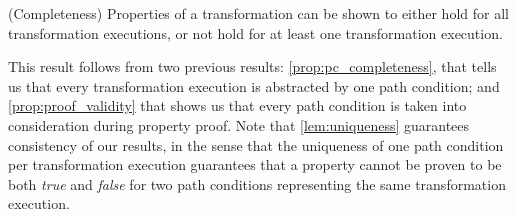 \begin{proposition}{(Completeness) Properties of a transformation can be shown to either hold for all transformation executions, or not hold for at least one transformation execution.}
\label{prop:proof_completeness}
\end{proposition}
\begin{pf}
This result follows from two previous results: \cref{prop:pc_completeness}, that tells us that every transformation execution is abstracted by one path condition; and \cref{prop:proof_validity} that shows us that every path condition is taken into consideration during property proof. Note that \cref{lem:uniqueness} guarantees consistency of our results, in the sense that the uniqueness of one path condition per transformation execution guarantees that a property cannot be proven to be both \emph{true} and \emph{false} for two path conditions representing the same transformation execution.
\end{pf}

% 
% 
% 
% 


